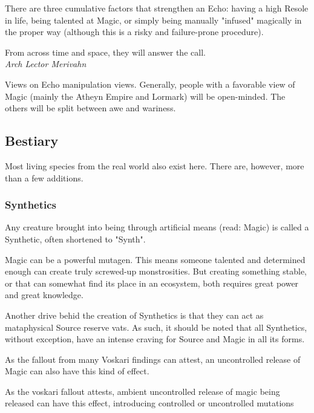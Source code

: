 There are three cumulative factors that strengthen an Echo: having a high Resole in life, being talented at Magic, or simply being manually "infused" magically in the proper way (although this is a risky and failure-prone procedure).

\begin{rpg-quotebox}
    From across time and space, they will answer the call. \\ \textendash \textit{Arch Lector Merivahn}
\end{rpg-quotebox}
        
Views on Echo manipulation views. Generally, people with a favorable view of Magic (mainly the Atheyn Empire and Lormark) will be open-minded. The others will be split between awe and wariness.




\subsection{Bestiary}

Most living species from the real world also exist here. There are, however, more than a few additions.



\subsubsection{Synthetics}

Any creature brought into being through artificial means (read: Magic) is called a Synthetic, often shortened to "Synth".

Magic can be a powerful mutagen. This means someone talented and determined enough can create truly screwed-up monstrosities. But creating something stable, or that can somewhat find its place in an ecosystem, both requires great power and great knowledge. 

Another drive behid the creation of Synthetics is that they can act as mataphysical Source reserve vats. As such, it should be noted that all Synthetics, without exception, have an intense craving for Source and Magic in all its forms.

As the fallout from many Voskari findings can attest, an uncontrolled release of Magic can also have this kind of effect.

As the voskari fallout attests, ambient uncontrolled release of magic being released can have this effect, introducing controlled or uncontrolled mutations 







